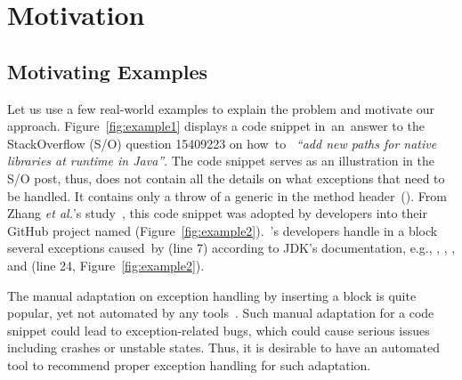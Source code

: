 \section{Motivation}
\label{motiv:sec}

\subsection{Motivating Examples}
\label{examples:sec}



Let us use a few real-world examples to explain the problem and
motivate our approach. Figure~\ref{fig:example1} displays a code
snippet in~an~answer to the StackOverflow (S/O) question 15409223 on
how~to~ {\em ``add new paths for native libraries at runtime in
  Java''}.  The code snippet serves as an illustration in the S/O
post, thus, does not contain all the details on what exceptions that
need to be handled. It contains only a throw of a generic
 in the method header~(). From
Zhang {\em et al.}'s study~\cite{zhang-icse19}, this code snippet was
adopted by developers into their GitHub project named 
(Figure~\ref{fig:example2}).~'s developers handle in a
 block several exceptions caused~by
 (line 7)
according to JDK's documentation, e.g.,
, ,
, and
 (line 24,
Figure~\ref{fig:example2}).

The manual adaptation on exception handling by inserting a
 block is quite popular, yet not automated by any
tools~\cite{zhang-icse19}. Such manual adaptation for a code snippet
could lead to exception-related bugs, which could cause serious issues
including crashes or unstable states.
Thus, it is desirable to have an automated tool to recommend proper
exception handling for such adaptation.


